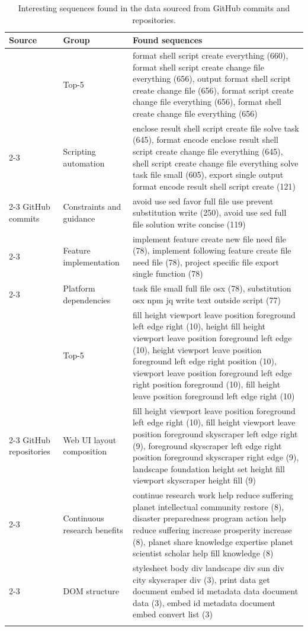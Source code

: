 \begin{longtable}{|m{15mm}|m{18mm}|m{8cm}|}
    \hline
    Source & Group & Found sequences  \\
    \hline
        & Top-5 & format shell script create everything (660), format shell script create change file everything (656), output format shell script create change file (656), format script create change file everything (656), format shell create change file everything (656) \\
        \cline{2-3}
        & Scripting automation & enclose result shell script create file solve task (645), format encode enclose result shell script create change file everything (645), shell script create change file everything solve task file small (605), export single output format encode result shell script create (121) \\
        \cline{2-3}
        GitHub commits & Constraints and guidance & avoid use sed favor full file use prevent substitution write (250), avoid use sed full file solution write concise (119) \\
        \cline{2-3}
        & Feature implementation & implement feature create new file need file (78), implement following feature create file need file (78), project specific file export single function (78) \\
        \cline{2-3}
        & Platform dependencies & task file small full file osx (78), substitution osx npm jq write text outside script (77) \\
    \hline
        & Top-5 & fill height viewport leave position foreground left edge right (10), height fill height viewport leave position foreground left edge (10), height viewport leave position foreground left edge right position (10), viewport leave position foreground left edge right position foreground (10), fill height leave position foreground left edge right (10) \\
        \cline{2-3}
        GitHub repositories & Web UI layout composition & fill height viewport leave position foreground left edge right (10), fill height viewport leave position foreground skyscraper left edge right (9), foreground skyscraper left edge right position foreground skyscraper right edge (9), landscape foundation height set height fill viewport skyscraper height fill (9) \\
        \cline{2-3}
        & Continuous research benefits & continue research work help reduce suffering planet intellectual community restore (8), disaster preparedness program action help reduce suffering increase prosperity increase (8), planet share knowledge expertise planet scientist scholar help fill knowledge (8) \\
        \cline{2-3}
        & DOM structure & stylesheet body div landscape div sun div city skyscraper div (3), print data get document embed id metadata data document data (3), embed id metadata document embed convert list (3) \\
    \hline
\caption{Interesting sequences found in the data sourced from GitHub commits and repositories.}
\label{table:sequences}
\end{longtable}

